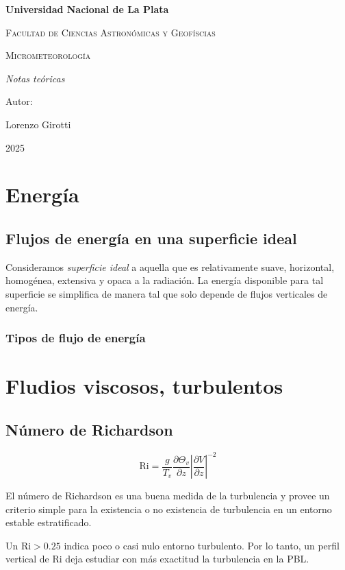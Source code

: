 \documentclass[utf-8,11pt,a4paper]{article}
\begin{document}
\begin{titlepage}
    \centering
    {\bfseries\LARGE Universidad Nacional de La Plata \par}\vspace{1cm}
    {\scshape\Large Facultad de Ciencias Astronómicas y Geofíscias \par}\vspace{3cm}
    {\scshape\Huge Micrometeorología \par}\vspace{3cm}
    {\itshape\Large Notas teóricas \par}
    \vfill
    {\Large Autor: \par}
    {\Large Lorenzo Girotti \par}
    \vfill
    {\Large 2025 \par}
\end{titlepage}

\section{Energía}

\subsection{Flujos de energía en una superficie ideal}

Consideramos \emph{superficie ideal} a aquella que es relativamente suave, horizontal, homogénea, extensiva y opaca a la radiación. La energía disponible para tal superficie se simplifica de manera tal que solo depende de flujos verticales de energía.

\subsubsection{Tipos de flujo de energía}



\section{Fludios viscosos, turbulentos}
\subsection{Número de Richardson}
\begin{equation}
    \mathrm{Ri}=\frac{g}{T_{v}}\frac{\partial \Theta_{v}}{\partial z}\left|\frac{\partial V}{\partial z}\right|^{-2}
\end{equation}
\par El número de Richardson es una buena medida de la turbulencia y provee un criterio simple para la existencia o no existencia de turbulencia en un entorno estable estratificado.
\par Un $\mathrm{Ri}>0.25$ indica poco o casi nulo entorno turbulento. Por lo tanto, un perfil vertical de $\mathrm{Ri}$ deja estudiar con más exactitud la turbulencia en la PBL.
\end{document}

